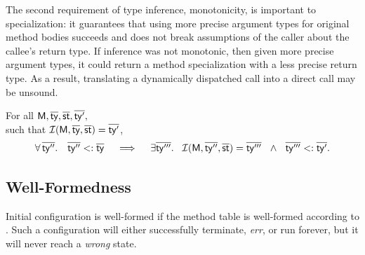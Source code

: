 The second requirement of type inference, monotonicity, is important to specialization:
it guarantees that using more precise argument types for original method
bodies succeeds and does not break assumptions of the caller about
the callee's return type. If inference was not
monotonic, then given more precise argument types, it could return
a method specialization with a less precise return type. As a result,
translating a dynamically dispatched call into a direct call may be unsound.

\begin{requirement}[Monotonicity]\label{prop:ti-monot}
  For all $\mathsf{M}, \overline{\mathsf{ty}},
  \overline{\mathsf{st}}, \overline{\mathsf{ty}'},$\\ such that $\operatorname{\mathcal{I}}(\mathsf{M}, \overline{\mathsf{ty}}, \overline{\mathsf{st}}) = \overline{\mathsf{ty}'}$,
  \[
    \forall\, \overline{\mathsf{ty}''}.\quad \overline{\mathsf{ty}''} <: \overline{\mathsf{ty}}
    \quad \implies \quad
    \exists \overline{\mathsf{ty}'''}.\ \
    \operatorname{\mathcal{I}}(\mathsf{M}, \overline{\mathsf{ty}''}, \overline{\mathsf{st}}) = \overline{\mathsf{ty}'''} \ \ \land\ \
    \overline{\mathsf{ty}'''} <: \overline{\mathsf{ty}'}.
  \]
\end{requirement}

\subsection{Well-Formedness}%
\label{wellform}

Initial \jules configuration \config{\emp\ \main()}{\mtbl} is well-formed
if the method table \mtbl is well-formed according to .
Such a configuration will either successfully terminate, \emph{err},
or run forever, but it will never reach a \emph{wrong} state.

